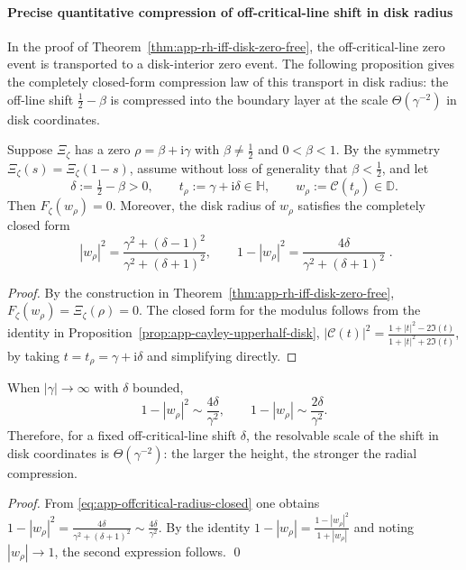 

\paragraph{Precise quantitative compression of off-critical-line shift in disk radius}
In the proof of Theorem~\ref{thm:app-rh-iff-disk-zero-free}, the off-critical-line zero event is transported to a disk-interior zero event.
The following proposition gives the completely closed-form compression law of this transport in disk radius: the off-line shift \(\tfrac12-\beta\) is compressed into the boundary layer at the scale \(\Theta(\gamma^{-2})\) in disk coordinates.

\begin{proposition}\label{prop:app-offcritical-radius-compression}
Suppose \(\Xi_{\zeta}\) has a zero \(\rho=\beta+\mathrm{i}\gamma\) with \(\beta\neq\tfrac12\) and \(0<\beta<1\).
By the symmetry \(\Xi_{\zeta}(s)=\Xi_{\zeta}(1-s)\), assume without loss of generality that \(\beta<\tfrac12\), and let
\[
\delta:=\tfrac12-\beta>0,
\qquad
t_{\rho}:=\gamma+\mathrm{i}\delta\in\mathbb{H},
\qquad
w_{\rho}:=\mathcal{C}(t_{\rho})\in\mathbb{D}.
\]
Then \(F_{\zeta}(w_{\rho})=0\).
Moreover, the disk radius of \(w_{\rho}\) satisfies the completely closed form
\begin{equation}\label{eq:app-offcritical-radius-closed}
\boxed{\;
|w_{\rho}|^{2}
=\frac{\gamma^{2}+(\delta-1)^{2}}{\gamma^{2}+(\delta+1)^{2}},
\qquad
1-|w_{\rho}|^{2}
=\frac{4\delta}{\gamma^{2}+(\delta+1)^{2}}\; }.
\end{equation}
\end{proposition}
\begin{proof}
By the construction in Theorem~\ref{thm:app-rh-iff-disk-zero-free}, \(F_{\zeta}(w_{\rho})=\Xi_{\zeta}(\rho)=0\).
The closed form for the modulus follows from the identity in Proposition~\ref{prop:app-cayley-upperhalf-disk},
\(
|\mathcal{C}(t)|^{2}=\frac{1+|t|^{2}-2\Im(t)}{1+|t|^{2}+2\Im(t)}
\),
by taking \(t=t_{\rho}=\gamma+\mathrm{i}\delta\) and simplifying directly.
\end{proof}

\begin{corollary}\label{cor:app-offcritical-radius-high-height}
When \(|\gamma|\to\infty\) with \(\delta\) bounded,
\[
1-|w_{\rho}|^{2}\sim \frac{4\delta}{\gamma^{2}},
\qquad
1-|w_{\rho}|\sim \frac{2\delta}{\gamma^{2}}.
\]
Therefore, for a fixed off-critical-line shift \(\delta\), the resolvable scale of the shift in disk coordinates is \(\Theta(\gamma^{-2})\): the larger the height, the stronger the radial compression.
\end{corollary}
\begin{proof}
From \eqref{eq:app-offcritical-radius-closed} one obtains
\(
1-|w_{\rho}|^{2}=\frac{4\delta}{\gamma^{2}+(\delta+1)^{2}}
\sim \frac{4\delta}{\gamma^{2}}
\).
By the identity
\(
1-|w_{\rho}|=\frac{1-|w_{\rho}|^{2}}{1+|w_{\rho}|}
\)
and noting \(|w_{\rho}|\to 1\), the second expression follows. \qed
\end{proof}

